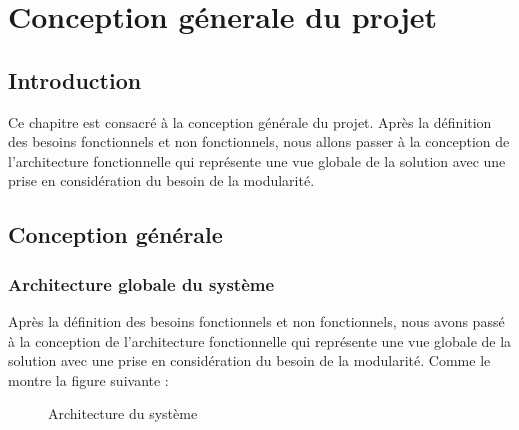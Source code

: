 \chapter{Conception g\'enerale du projet}

\section{Introduction}
Ce chapitre est consacr\'e \`a la conception g\'en\'erale du projet. Apr\`es la d\'efinition des besoins fonctionnels et non fonctionnels, nous allons passer \`a la conception de l'architecture fonctionnelle qui repr\'esente une vue globale de la solution avec une prise en consid\'eration du besoin de la modularit\'e. 

\section{Conception g\'en\'erale}

\subsection{Architecture globale du syst\`eme}

Apr\`es la d\'efinition des besoins fonctionnels et non fonctionnels, nous avons pass\'e \`a la conception de l'architecture fonctionnelle qui repr\'esente une vue globale de la solution avec une prise en consid\'eration du besoin de la modularit\'e. Comme le montre la figure suivante :

\begin{figure}[h]
	\caption{\label{fig:my-label} Architecture du syst\`eme}
\end{figure}

